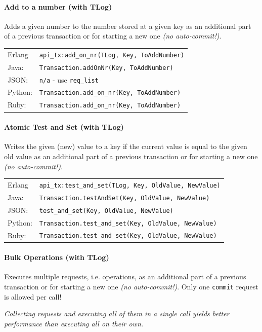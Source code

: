 \documentclass[a4paper]{scrreprt}
\newcommand{\code}[1]{\lstinline[basicstyle=\ttfamily]!#1!}
\begin{document}
\paragraph{Add to a number (with TLog)}
Adds a given number to the number stored at a given key as an additional part
of a previous transaction or for starting a new one \emph{(no auto-commit!)}.

\begin{tabular}{lp{14cm}}
Erlang  & \code{api_tx:add_on_nr(TLog, Key, ToAddNumber)}\\
Java:   & \code{Transaction.addOnNr(Key, ToAddNumber)}\\
JSON:   & \code{n/a} - use \code{req_list}\\
Python: & \code{Transaction.add_on_nr(Key, ToAddNumber)}\\
Ruby:   & \code{Transaction.add_on_nr(Key, ToAddNumber)}
\end{tabular}

\paragraph{Atomic Test and Set (with TLog)}
Writes the given (new) value to a key if the current value is equal to the
given old value as an additional part
of a previous transaction or for starting a new one \emph{(no auto-commit!)}.

\begin{tabular}{lp{14cm}}
Erlang  & \code{api_tx:test_and_set(TLog, Key, OldValue, NewValue)}\\
Java:   & \code{Transaction.testAndSet(Key, OldValue, NewValue)}\\
JSON:   & \code{test_and_set(Key, OldValue, NewValue)}\\
Python: & \code{Transaction.test_and_set(Key, OldValue, NewValue)}\\
Ruby:   & \code{Transaction.test_and_set(Key, OldValue, NewValue)}
\end{tabular}

\paragraph{Bulk Operations (with TLog)}
Executes multiple requests, i.e. operations, as an additional part
of a previous transaction or for starting a new one \emph{(no auto-commit!)}.
Only one \code{commit} request is allowed per call!

\emph{Collecting requests and executing all of them in a single call yields
better performance than executing all on their own.}
\end{document}
